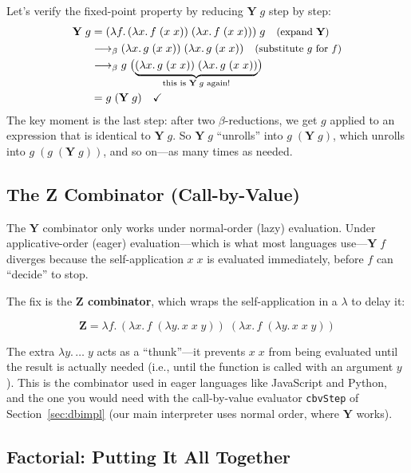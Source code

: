 \documentclass[11pt,a4paper]{article}
\theoremstyle{definition}
\newcommand{\lam}{\lambda}
\newcommand{\reduce}{\longrightarrow_\beta}
\newcommand{\rmark}[1]{\quad\text{\small(#1)}}
\begin{document}
\begin{workedexample}[$\mathbf{Y}\;g = g\;(\mathbf{Y}\;g)$]
Let's verify the fixed-point property by reducing $\mathbf{Y}\;g$ step by step:
\begin{align*}
  \mathbf{Y}\;g
  &= (\lam f.\, (\lam x.\, f\;(x\;x))\;(\lam x.\, f\;(x\;x)))\;g
    \rmark{expand $\mathbf{Y}$} \\
  &\reduce (\lam x.\, g\;(x\;x))\;(\lam x.\, g\;(x\;x))
    \rmark{substitute $g$ for $f$} \\
  &\reduce g\;\bigl(\underbrace{(\lam x.\, g\;(x\;x))\;(\lam x.\, g\;(x\;x))}_{\text{this is } \mathbf{Y}\;g \text{ again!}}\bigr) \\
  &= g\;(\mathbf{Y}\;g) \quad\checkmark
\end{align*}
The key moment is the last step: after two $\beta$-reductions, we get
$g$ applied to an expression that is identical to $\mathbf{Y}\;g$. So
$\mathbf{Y}\;g$ ``unrolls'' into $g\;(\mathbf{Y}\;g)$, which unrolls into
$g\;(g\;(\mathbf{Y}\;g))$, and so on---as many times as needed.
\end{workedexample}

\subsection{The Z Combinator (Call-by-Value)}

The $\mathbf{Y}$ combinator only works under normal-order (lazy) evaluation.
Under applicative-order (eager) evaluation---which is what most languages
use---$\mathbf{Y}\;f$ diverges because the self-application $x\;x$ is
evaluated immediately, before $f$ can ``decide'' to stop.

The fix is the \textbf{Z combinator}, which wraps the self-application in a
$\lam$ to delay it:

\[
\mathbf{Z} = \lam f.\, (\lam x.\, f\;(\lam y.\, x\;x\;y))\;(\lam x.\, f\;(\lam y.\, x\;x\;y))
\]

The extra $\lam y.\, \ldots\; y$ acts as a ``thunk''---it prevents $x\;x$
from being evaluated until the result is actually needed (i.e., until the
function is called with an argument $y$). This is the combinator used in
eager languages like JavaScript and Python, and the one you would need with
the call-by-value evaluator \texttt{cbvStep} of Section~\ref{sec:dbimpl}
(our main interpreter uses normal order, where $\mathbf{Y}$ works).

\subsection{Factorial: Putting It All Together}
\end{document}
